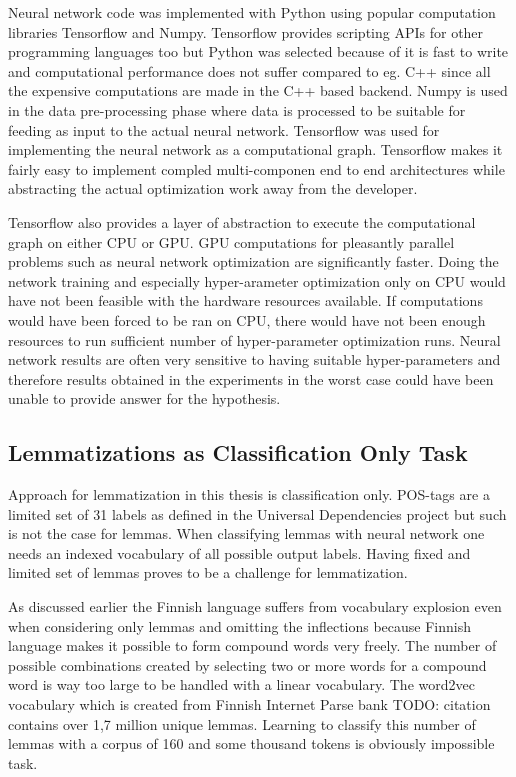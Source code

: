 \documentclass[12pt,a4paper,english
]{tutthesis}
\newcommand\todo[1]{{\color{red}TODO: #1}} %
\begin{document}
Neural network code was implemented with Python using popular computation libraries Tensorflow and Numpy. Tensorflow provides scripting APIs for other programming languages too but Python was selected because of it is fast to write and computational performance does not suffer compared to eg. C++ since all the expensive computations are made in the C++ based backend. Numpy is used in the data pre-processing phase where data is processed to be suitable for feeding as input to the actual neural network. Tensorflow was used for implementing the neural network as a computational graph. Tensorflow makes it fairly easy to implement compled multi-componen end to end architectures while abstracting the actual optimization work away from the developer.

Tensorflow also provides a layer of abstraction to execute the computational graph on either CPU or GPU. GPU computations for pleasantly parallel problems such as neural network optimization are significantly faster. Doing the network training and especially hyper-arameter optimization only on CPU would have not been feasible with the hardware resources available. If computations would have been forced to be ran on CPU, there would have not been enough resources to run sufficient number of hyper-parameter optimization runs. Neural network results are often very sensitive to having suitable hyper-parameters and therefore results obtained in the experiments in the worst case could have been unable to provide answer for the hypothesis.

\subsection{Lemmatizations as Classification Only Task}
Approach for lemmatization in this thesis is classification only. POS-tags are a limited set of 31 labels as defined in the Universal Dependencies project but such is not the case for lemmas. When classifying lemmas with neural network one needs an indexed vocabulary of all possible output labels. Having fixed and limited set of lemmas proves to be a challenge for lemmatization.

As discussed earlier the Finnish language suffers from vocabulary explosion even when considering only lemmas and omitting the inflections because Finnish language makes it possible to form compound words very freely. The number of possible combinations created by selecting two or more words for a compound word is way too large to be handled with a linear vocabulary. The word2vec vocabulary which is created from Finnish Internet Parse bank \todo{citation} contains over 1,7 million unique lemmas. Learning to classify this number of lemmas with a corpus of 160 and some thousand tokens is obviously impossible task.
\end{document}
